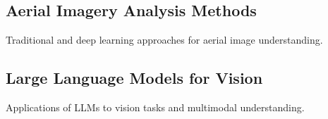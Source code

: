\subsection{Aerial Imagery Analysis Methods}

Traditional and deep learning approaches for aerial image understanding.

\subsection{Large Language Models for Vision}

Applications of LLMs to vision tasks and multimodal understanding.
